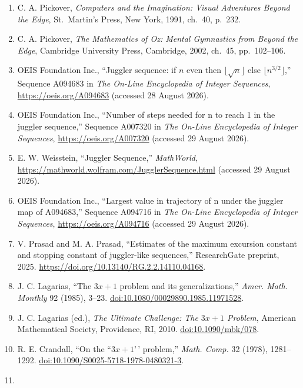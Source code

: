 \documentclass[12pt]{article}
\begin{document}
\begingroup\small

\begin{enumerate}
\def\labelenumi{\arabic{enumi}.}
\item
  C. A. Pickover, \emph{Computers and the Imagination: Visual Adventures
  Beyond the Edge}, St.~Martin's Press, New York, 1991, ch.~40, p.~232.
\item
  C. A. Pickover, \emph{The Mathematics of Oz: Mental Gymnastics from
  Beyond the Edge}, Cambridge University Press, Cambridge, 2002, ch.~45,
  pp.~102--106.
\item
  OEIS Foundation Inc., ``Juggler sequence: if \(n\) even then
  \(\lfloor\sqrt n\rfloor\) else \(\lfloor n^{3/2}\rfloor\),'' Sequence
  A094683 in \emph{The On-Line Encyclopedia of Integer Sequences},
  \url{https://oeis.org/A094683} (accessed 28 August 2026).
\item
  OEIS Foundation Inc., ``Number of steps needed for n to reach 1 in the
  juggler sequence,'' Sequence A007320 in \emph{The On-Line Encyclopedia
  of Integer Sequences}, \url{https://oeis.org/A007320} (accessed 29
  August 2026).
\item
  E. W. Weisstein, ``Juggler Sequence,'' \emph{MathWorld},
  \url{https://mathworld.wolfram.com/JugglerSequence.html} (accessed 29
  August 2026).
\item
  OEIS Foundation Inc., ``Largest value in trajectory of n under the
  juggler map of A094683,'' Sequence A094716 in \emph{The On-Line
  Encyclopedia of Integer Sequences}, \url{https://oeis.org/A094716}
  (accessed 29 August 2026).
\item
  V. Prasad and M. A. Prasad, ``Estimates of the maximum excursion
  constant and stopping constant of juggler-like sequences,''
  ResearchGate preprint, 2025.
  \url{https://doi.org/10.13140/RG.2.2.14110.04168}.
\item
  J. C. Lagarias, ``The \(3x+1\) problem and its generalizations,''
  \emph{Amer. Math. Monthly} 92 (1985), 3--23.
  \href{https://doi.org/10.1080/00029890.1985.11971528}{doi:10.1080/00029890.1985.11971528}.
\item
  J. C. Lagarias (ed.), \emph{The Ultimate Challenge: The \(3x+1\)
  Problem}, American Mathematical Society, Providence, RI, 2010.
  \href{https://doi.org/10.1090/mbk/078}{doi:10.1090/mbk/078}.
\item
  R. E. Crandall, ``On the ``\(3x+1\)'\,' problem,'' \emph{Math. Comp.}
  32 (1978), 1281--1292.
  \href{https://doi.org/10.1090/S0025-5718-1978-0480321-3}{doi:10.1090/S0025-5718-1978-0480321-3}.
\item

\end{enumerate}
\end{document}
